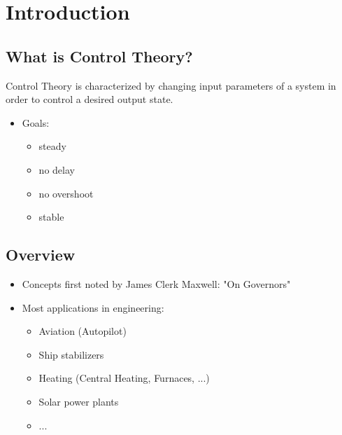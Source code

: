 \section{Introduction}
\label{sec:introduction}
\subsection{What is Control Theory?}
\label{subsec:introduction-definition}
\begin{frame}{\insertsubsection}
	Control Theory is characterized by changing input parameters of a system in order to control a desired output state.
	\begin{itemize}[<+->]
		\item Goals:
		\begin{itemize}[<+->]
			\item steady
			\item no delay
			\item no overshoot
			\item stable
		\end{itemize}
	\end{itemize}
\end{frame}
%
%
\subsection{Overview}
\label{subsec:introduction-overview}
\begin{frame}{\insertsubsection}
	\begin{itemize}[<+->]
		\item Concepts first noted by James Clerk Maxwell: "On Governors"~\cite{Maxwell1868}
		\item Most applications in engineering:
		\begin{itemize}[<+->]
			\item Aviation (Autopilot)
			\item Ship stabilizers
			\item Heating (Central Heating, Furnaces, ...)
			\item Solar power plants
			\item ...
		\end{itemize}
	\end{itemize}
\end{frame}
%
%
\begin{frame}{\insertsubsection}
	
\end{frame}
%
%